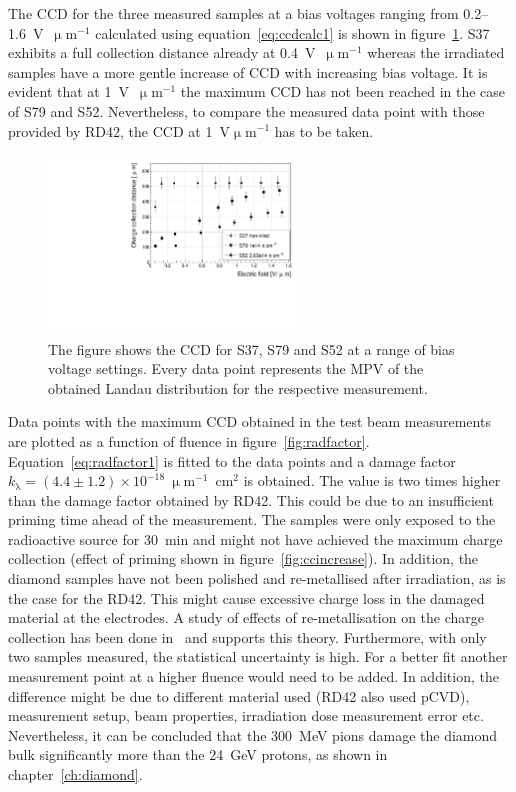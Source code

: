 The CCD for the three measured samples at a bias voltages ranging from 0.2--1.6~V~$\upmu$m$^{-1}$ calculated using equation~\ref{eq:ccdcalc1} is shown in figure~\ref{fig:ccd}. S37 exhibits a full collection distance already at 0.4~V~$\upmu$m$^{-1}$ whereas the irradiated samples have a more gentle increase of CCD with increasing bias voltage. It is evident that at 1~V~$\upmu$m$^{-1}$  the maximum CCD has not been reached in the case of S79 and S52. Nevertheless, to compare the measured data point with those provided by RD42, the CCD at 1~V$\upmu$m$^{-1}$ has to be taken.

\begin{figure}[!t]
\begin{center}
\includegraphics[width=0.6\textwidth]{03_measurement_results/scripts/plots/ccd}
\caption{The figure shows the CCD for S37, S79 and S52 at a range of bias voltage settings. Every data point represents the MPV of the obtained Landau distribution for the respective measurement.}
\label{fig:ccd}
\end{center}
\end{figure}

Data points with the maximum CCD obtained in the test beam measurements are plotted as a function of fluence in figure~\ref{fig:radfactor}. Equation~\ref{eq:radfactor1} is fitted to the data points and a damage factor $k_{\mathrm{\lambda}}=(4.4\pm1.2)\times10^{-18}~\upmu$m$^{-1}$~cm$^{2}$ is obtained. The value is two times higher than the damage factor obtained by RD42. %
This could be due to an insufficient priming time ahead of the measurement. The samples were only exposed to the radioactive source for 30~min and might not have achieved the maximum charge collection (effect of priming shown in figure~\ref{fig:ccincrease}). In addition, the diamond samples have not been polished and re-metallised after irradiation, as is the case for the RD42. This might cause excessive charge loss in the damaged material at the electrodes. A study of effects of re-metallisation on the charge collection has been done in~\cite{pomorski2008electronic} and supports this theory. Furthermore, with only two samples measured, the statistical uncertainty is high. For a better fit another measurement point at a higher fluence would need to be added. In addition, the difference might be due to different material used (RD42 also used pCVD), measurement setup, beam properties, irradiation dose measurement error etc. Nevertheless, it can be concluded that the 300~MeV pions damage the diamond bulk significantly more than the 24~GeV protons, as shown in chapter~\ref{ch:diamond}.

